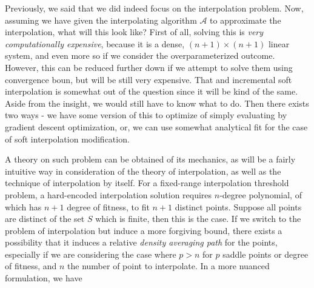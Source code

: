 \documentclass[10pt]{article} %
\begin{document}
Previously, we said that we did indeed focus on the interpolation problem. Now, assuming we have given the interpolating algorithm $\mathcal{A}$ to approximate the interpolation, what will this look like? First of all, solving this is \textit{very computationally expensive}, because it is a dense, $(n+1)\times(n+1)$ linear system, and even more so if we consider the overparameterized outcome. However, this can be reduced further down if we attempt to solve them using convergence boun, but will be still very expensive. That and incremental soft interpolation is somewhat out of the question since it will be kind of the same. Aside from the insight, we would still have to know what to do. Then there exists two ways - we have some version of this to optimize of simply evaluating by gradient descent optimization, or, we can use somewhat analytical fit for the case of soft interpolation modification. 

A theory on such problem can be obtained of its mechanics, as will be a fairly intuitive way in consideration of the theory of interpolation, as well as the technique of interpolation by itself. For a fixed-range interpolation threshold problem, a hard-encoded interpolation solution requires $n$-degree polynomial, of which has $n+1$ degree of fitness, to fit $n+1$ distinct points. Suppose all points are distinct of the set $S$ which is finite, then this is the case. If we switch to the problem of interpolation but induce a more forgiving bound, there exists a possibility that it induces a relative \textit{density averaging path} for the points, especially if we are considering the case where $p>n$ for $p$ saddle points or degree of fitness, and $n$ the number of point to interpolate. In a more nuanced formulation, we have
\end{document}
